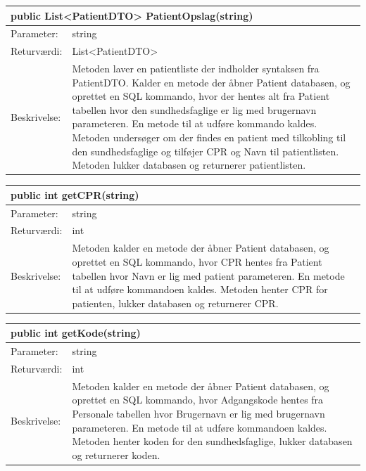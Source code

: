 \begin{table}[H]
\label{tab:tabel2}
\begin{tabular}{| l | p{13cm} |}
   \hline
   \multicolumn{2}{|l|}{public List<PatientDTO> PatientOpslag(string)} \\ \hline
   Parameter: & string \\ \hline
   Returværdi: & List<PatientDTO>\\ \hline
   Beskrivelse: & Metoden laver en patientliste der indholder syntaksen fra PatientDTO. Kalder en metode der åbner Patient databasen, og oprettet en SQL kommando, hvor der hentes alt fra Patient tabellen hvor den sundhedsfaglige er lig med brugernavn parameteren. En metode til at udføre kommando kaldes. Metoden undersøger om der findes en patient med tilkobling til den sundhedsfaglige og tilføjer CPR og Navn til patientlisten. Metoden lukker databasen og returnerer patientlisten. \\ \hline
\end{tabular}
\end{table}
\begin{table}[H]
\label{tab:tabel2}
\begin{tabular}{| l | p{13cm} |}
   \hline
   \multicolumn{2}{|l|}{public int getCPR(string)} \\ \hline
   Parameter: & string \\ \hline
   Returværdi: & int\\ \hline
   Beskrivelse: & Metoden kalder en metode der åbner Patient databasen, og oprettet en SQL kommando, hvor CPR hentes fra Patient tabellen hvor Navn er lig med patient parameteren. En metode til at udføre kommandoen kaldes. Metoden henter CPR for patienten, lukker databasen og returnerer CPR. \\ \hline
\end{tabular}
\end{table}
\begin{table}[H]
\label{tab:tabel2}
\begin{tabular}{| l | p{13cm} |}
   \hline
   \multicolumn{2}{|l|}{public int getKode(string)} \\ \hline
   Parameter: & string \\ \hline
   Returværdi: & int\\ \hline
   Beskrivelse: & Metoden kalder en metode der åbner Patient databasen, og oprettet en SQL kommando, hvor Adgangskode hentes fra Personale tabellen hvor Brugernavn er lig med brugernavn parameteren. En metode til at udføre kommandoen kaldes. Metoden henter koden for den sundhedsfaglige, lukker databasen og returnerer koden. \\ \hline
\end{tabular}
\end{table}
